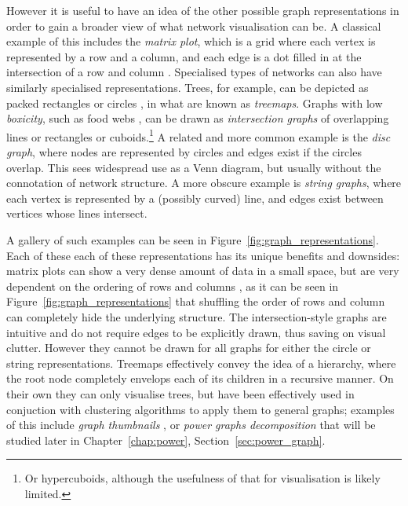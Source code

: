 However it is useful to have an idea of the other possible graph representations in order to gain a broader view of what network visualisation can be. A classical example of this includes the \emph{matrix plot}, which is a grid where each vertex is represented by a row and a column, and each edge is a dot filled in at the intersection of a row and column \cite{Liiv2010}.
Specialised types of networks can also have similarly specialised representations. Trees, for example, can be depicted as packed rectangles \cite{Johnson1991} or circles \cite{Wang2006}, in what are known as \emph{treemaps}.
Graphs with low \emph{boxicity}, such as food webs \cite{Eklof2013}, can be drawn as \emph{intersection graphs} of overlapping lines or rectangles or cuboids.\footnote{Or hypercuboids, although the usefulness of that for visualisation is likely limited.}
A related and more common example is the \emph{disc graph}, where nodes are represented by circles and edges exist if the circles overlap. This sees widespread use as a Venn diagram, but usually without the connotation of network structure.
A more obscure example is \emph{string graphs}, where each vertex is represented by a (possibly curved) line, and edges exist between vertices whose lines intersect.

A gallery of such examples can be seen in Figure~\ref{fig:graph_representations}.
Each of these each of these representations has its unique benefits and downsides: matrix plots can show a very dense amount of data in a small space, but are very dependent on the ordering of rows and columns \cite{Liiv2010}, as it can be seen in Figure~\ref{fig:graph_representations} that shuffling the order of rows and column can completely hide the underlying structure.
The intersection-style graphs are intuitive and do not require edges to be explicitly drawn, thus saving on visual clutter. However they cannot be drawn for all graphs for either the circle \cite{McDiarmid2014} or string \cite{Schaefer2003} representations.
Treemaps effectively convey the idea of a hierarchy, where the root node completely envelops each of its children in a recursive manner. On their own they can only visualise trees, but have been effectively used in conjuction with clustering algorithms to apply them to general graphs; examples of this include \emph{graph thumbnails} \cite{Yoghourdjian2018}, or \emph{power graphs decomposition} \cite{Dwyer2014} that will be studied later in Chapter~\ref{chap:power}, Section~\ref{sec:power_graph}.
  

